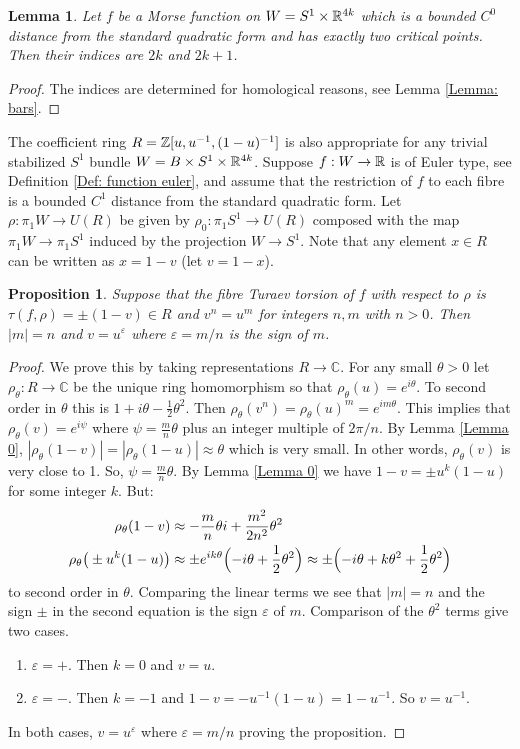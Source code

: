 \documentclass[11pt]{article}
\numberwithin{equation}{section}\providecommand{\dpl}{\displaystyle}
\theoremstyle{plain}
\newtheorem{lemma}[theorem]{Lemma}
\newtheorem{proposition}[theorem]{Proposition}
\theoremstyle{definition}
\let\ve\varepsilon
\newcommand{\bC}{\mathbb{C}}\newcommand{\bD}{\mathbb{D}}
\begin{document}
\begin{lemma}\label{Lemma 0.0}
Let $f$ be a Morse function on $W=S^1\times \mathbb{R}^{4k}$ which is a bounded $C^0$ distance from the standard quadratic form and has exactly two critical points. Then their indices are $2k$ and $2k+1$.
\end{lemma}

\begin{proof}
The indices are determined for homological reasons, see Lemma \ref{Lemma: bars}.
\end{proof}

The coefficient ring $R=\mathbb{Z}[u,u^{-1},(1-u)^{-1}]$ is also appropriate for any trivial stabilized $S^1$ bundle $W=B\times S^1\times \mathbb{R}^{4k}$. Suppose $f:W\to \mathbb{R}$ is of Euler type, see Definition \ref{Def: function euler}, and assume that the restriction of $f$ to each fibre is a bounded $C^1$ distance from the standard quadratic form. Let $\rho:\pi_1W\to U(R)$ be given by $\rho_0:\pi_1S^1\to U(R)$ composed with the map $\pi_1W\to \pi_1S^1$ induced by the projection $W\to S^1$. Note that any element $x\in R$ can be written as $x=1-v$ (let $v=1-x$).

\begin{proposition}\label{prop: un=vm lemma}
Suppose that the fibre Turaev torsion of $f$ with respect to $\rho$ is $\tau(f,\rho)=\pm(1-v)\in R$ and $v^n=u^m$ for integers $n,m$ with $n>0$. Then $|m|=n$ and $v=u^\varepsilon$ where $\varepsilon=m/n$ is the sign of $m$.
\end{proposition}

\begin{proof}
We prove this by taking representations $R\to \bC$. For any small $\theta>0$ let \hbox{$\rho_\theta:R\to\bC$} be the unique ring homomorphism so that $\rho_\theta(u)=e^{i\theta}$. To second order in $\theta$ this is $1+i\theta-\frac12\theta^2$. Then $\rho_\theta(v^n)=\rho_\theta(u)^m=e^{im\theta}$. This implies that $\rho_\theta(v)=e^{i\psi}$ where $\psi=\frac mn\theta$ plus an integer multiple of $2\pi/n$. By Lemma \ref{Lemma 0}, $|\rho_\theta(1-v)|=|\rho_\theta(1-u)|\approx \theta$ which is very small. In other words, $\rho_\theta(v)$ is very close to 1. So, $\psi=\frac mn\theta$. By Lemma \ref{Lemma 0} we have $1-v= \pm u^k(1-u)$ for some integer $k$. But:
\begin{align*}
\rho_\theta(1-v)&\approx -\frac mn\theta i+\frac{m^2}{2n^2}\theta^2\\
\rho_\theta\big(\pm u^k (1-u)\big)&\approx \pm e^{ik\theta}\Bigl(
-i\theta +\frac12 \theta^2
\Bigr)\approx \pm \Bigl(
-i\theta +k\theta^2+\frac12\theta^2
\Bigr)
\end{align*}
to second order in $\theta$. Comparing the linear terms we see that $|m|= n$ and the sign $\pm$ in the second equation is the sign $\ve$ of $m$. Comparison of the $\theta^2$ terms give two cases.
\begin{enumerate}
\item $\ve=+$. Then $k=0$ and $v=u$.
\item $\ve=-$. Then $k=-1$ and $1-v=-u^{-1}(1-u)=1-u^{-1}$. So $v=u^{-1}$.
\end{enumerate}
In both cases, $v=u^\ve$ where $\ve=m/n$ proving the proposition.
\end{proof}
\end{document}
